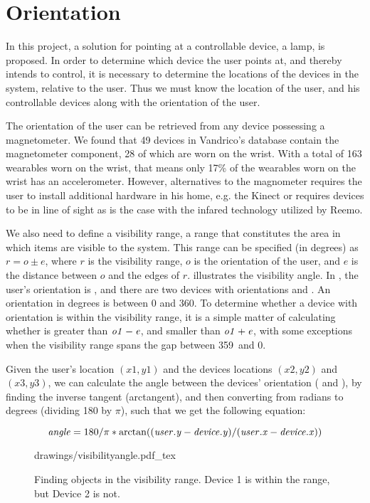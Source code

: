 \section{Orientation}\label{sec:analysis:orientation}
In this project, a solution for pointing at a controllable device, \eg a lamp, is proposed. 
In order to determine which device the user points at, 
and thereby intends to control, 
it is necessary to determine the locations of the devices in the system, 
relative to the user. 
Thus we must know the location of the user, 
and his controllable devices along with the orientation of the user.

The orientation of the user can be retrieved from any device possessing a magnetometer. 
We found that \num{49} devices in Vandrico's database contain the magnetometer component, 28 of which are worn on the wrist.
With a total of 163 wearables worn on the wrist, that means only 17\% of the wearables worn on the wrist has an accelerometer. However, alternatives to the magnometer requires the user to install additional hardware in his home, e.g. the Kinect or requires devices to be in line of sight as is the case with the infared technology utilized by Reemo.

We also need to define a visibility range, 
\ie a range that constitutes the area in which items are visible to the system. 
This range can be specified (in degrees) as $r = o \pm e$, 
where $r$ is the visibility range, $o$ is the orientation of the user, 
and $e$ is the distance between $o$ and the edges of $r$.
 illustrates the visibility angle. 
In , the user's orientation is , 
and there are two devices with orientations  and . 
An orientation in degrees is between \num{0} and \num{360}. 
To determine whether a device with orientation  is within the visibility range, 
it is a simple matter of calculating whether  is greater than $\var{o1}-\var{e}$, 
and smaller than $\var{o1}+\var{e}$, 
with some exceptions when the visibility range spans the gap between 359\degree \ and 0\degree.

Given the user's location $(x1, y1)$ and the devices locations $(x2, y2)$ and $(x3, y3)$,
we can calculate the angle between the devices' orientation ( and ), 
by finding the inverse tangent (arctangent), 
and then converting from radians to degrees (dividing \num{180} by $\pi$), 
such that we get the following equation:

\begin{equation}\label{eq:angle}
\var{angle} = 180 / \pi * \arctan((\var{user.y} - \var{device.y}) / (\var{user.x} - \var{device.x}))
\end{equation}

\begin{figure}[!htb]
    \centering
    \def\svgwidth{0.6\textwidth}
    {drawings/visibilityangle.pdf_tex}
    \caption{Finding objects in the visibility range. Device 1 is within the range, but Device 2 is not.}
\label{fig:visibilityangle}
\end{figure}

